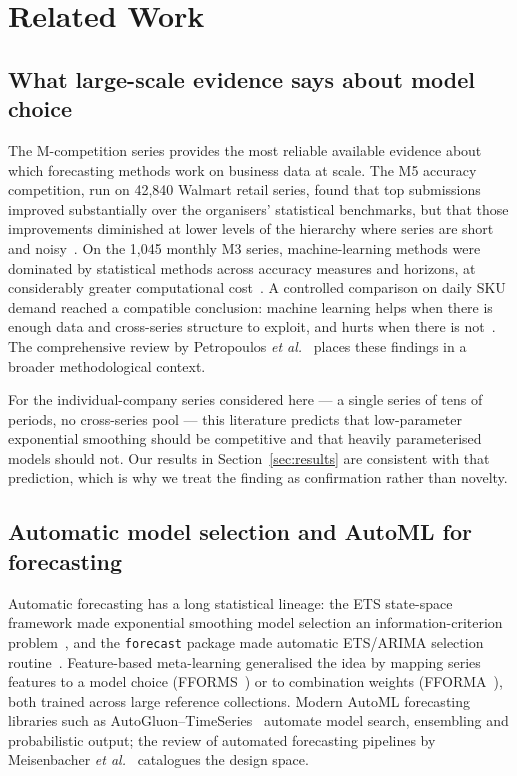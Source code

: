 \documentclass[conference]{IEEEtran}
\begin{document}
\section{Related Work}
\label{sec:related}

\subsection{What large-scale evidence says about model choice}

The M-competition series provides the most reliable available evidence about
which forecasting methods work on business data at scale. The M5 accuracy
competition, run on 42{,}840 Walmart retail series, found that top submissions
improved substantially over the organisers' statistical benchmarks, but that
those improvements diminished at lower levels of the hierarchy where series
are short and noisy~\cite{makridakis2022m5acc}. On the 1{,}045 monthly M3
series, machine-learning methods were dominated by statistical methods across
accuracy measures and horizons, at considerably greater computational
cost~\cite{makridakis2018statml}. A controlled comparison on daily SKU demand
reached a compatible conclusion: machine learning helps when there is enough
data and cross-series structure to exploit, and hurts when there is
not~\cite{spiliotis2022sku}. The comprehensive review by Petropoulos
\emph{et al.}~\cite{petropoulos2022theory} places these findings in a broader
methodological context.

For the individual-company series considered here --- a single series of tens
of periods, no cross-series pool --- this literature predicts that
low-parameter exponential smoothing should be competitive and that heavily
parameterised models should not. Our results in
Section~\ref{sec:results} are consistent with that prediction, which is why we
treat the finding as confirmation rather than novelty.

\subsection{Automatic model selection and AutoML for forecasting}

Automatic forecasting has a long statistical lineage: the ETS state-space
framework made exponential smoothing model selection an information-criterion
problem~\cite{hyndman2002statespace}, and the \texttt{forecast} package made
automatic ETS/ARIMA selection routine~\cite{hyndman2008forecastpkg}.
Feature-based meta-learning generalised the idea by mapping series features to
a model choice (FFORMS~\cite{talagala2023fforms}) or to combination weights
(FFORMA~\cite{monteromanso2020fforma}), both trained across large reference
collections. Modern AutoML forecasting libraries such as
AutoGluon--TimeSeries~\cite{shchur2023autogluon} automate model search,
ensembling and probabilistic output; the review of automated forecasting
pipelines by Meisenbacher \emph{et al.}~\cite{meisenbacher2022pipelines}
catalogues the design space.
\end{document}
